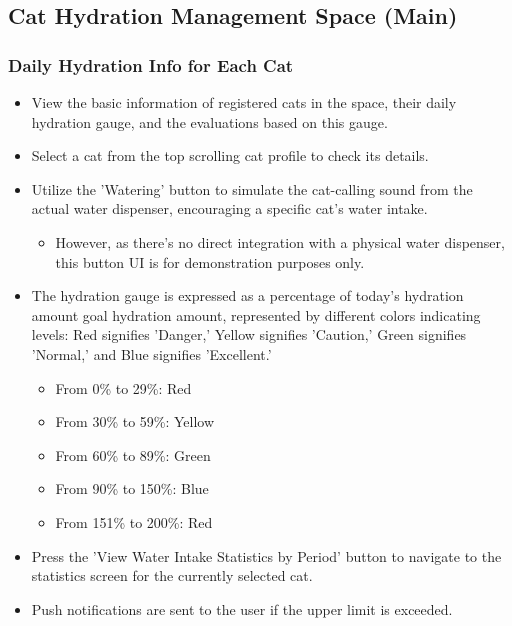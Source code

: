 \documentclass[conference]{IEEEtran}
\begin{document}
\subsection{Cat Hydration Management Space (Main)}
\subsubsection{Daily Hydration Info for Each Cat}
\begin{itemize}
    \item View the basic information of registered cats in the space, their daily hydration gauge, and the evaluations based on this gauge.
    \item Select a cat from the top scrolling cat profile to check its details.
    \item Utilize the 'Watering' button to simulate the cat-calling sound from the actual water dispenser, encouraging a specific cat's water intake. 
    \begin{itemize}
        \item However, as there's no direct integration with a physical water dispenser, this button UI is for demonstration purposes only.
    \end{itemize}
    \item The hydration gauge is expressed as a percentage of today's hydration amount \/ goal hydration amount, represented by different colors indicating levels: Red signifies 'Danger,' Yellow signifies 'Caution,' Green signifies 'Normal,' and Blue signifies 'Excellent.'
    \begin{itemize}
        \item From 0\% to 29\%: Red
        \item From 30\% to 59\%: Yellow
        \item From 60\% to 89\%: Green
        \item From 90\% to 150\%: Blue
        \item From 151\% to 200\%: Red
    \end{itemize}
    \item Press the 'View Water Intake Statistics by Period' button to navigate to the statistics screen for the currently selected cat.
    \item Push notifications are sent to the user if the upper limit is exceeded.\\
\end{itemize}
\end{document}
